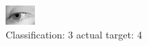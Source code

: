 \begin{figure}[h!]
\begin{center}
\includegraphics[width=0.60\columnwidth]{figures/ID2894_class_3_target_4.png}
\end{center}
\caption{ Classification: 3 actual target: 4}
\label{fig:ID2894_class_3_target_4}
\end{figure}
